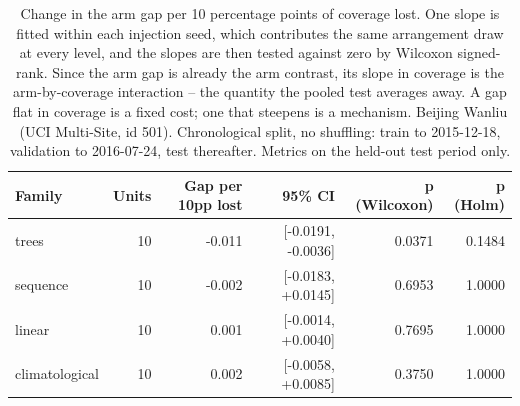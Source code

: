 \begin{table}[htbp]
\caption{Change in the arm gap per 10 percentage points of coverage lost. One slope is fitted within each injection seed, which contributes the same arrangement draw at every level, and the slopes are then tested against zero by Wilcoxon signed-rank. Since the arm gap is already the arm contrast, its slope in coverage is the arm-by-coverage interaction -- the quantity the pooled test averages away. A gap flat in coverage is a fixed cost; one that steepens is a mechanism. Beijing Wanliu (UCI Multi-Site, id 501). Chronological split, no shuffling: train to 2015-12-18, validation to 2016-07-24, test thereafter. Metrics on the held-out test period only.}
\label{tab:ablation_dose_response}
\begin{tabular}{lrrrrr}
\toprule
Family & Units & Gap per 10pp lost & 95\% CI & p (Wilcoxon) & p (Holm) \\
\midrule
trees & 10 & -0.011 & [-0.0191, -0.0036] & 0.0371 & 0.1484 \\
sequence & 10 & -0.002 & [-0.0183, +0.0145] & 0.6953 & 1.0000 \\
linear & 10 & 0.001 & [-0.0014, +0.0040] & 0.7695 & 1.0000 \\
climatological & 10 & 0.002 & [-0.0058, +0.0085] & 0.3750 & 1.0000 \\
\bottomrule
\end{tabular}
\end{table}
